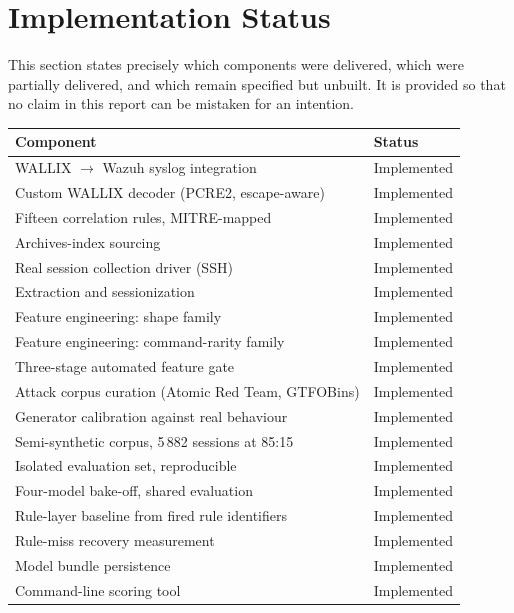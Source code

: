 \documentclass{classeENS}
\begin{document}
\section{Implementation Status}
\label{sec:status}

This section states precisely which components were delivered, which were partially delivered, and which remain specified but unbuilt. It is provided so that no claim in this report can be mistaken for an intention.

\begin{table}[H]
\centering
\begin{tabular}{|l|l|}
\hline
\textbf{Component} & \textbf{Status} \\
\hline
WALLIX $\rightarrow$ Wazuh syslog integration & Implemented \\
Custom WALLIX decoder (PCRE2, escape-aware) & Implemented \\
Fifteen correlation rules, MITRE-mapped & Implemented \\
Archives-index sourcing & Implemented \\
Real session collection driver (SSH) & Implemented \\
Extraction and sessionization & Implemented \\
Feature engineering: shape family & Implemented \\
Feature engineering: command-rarity family & Implemented \\
Three-stage automated feature gate & Implemented \\
Attack corpus curation (Atomic Red Team, GTFOBins) & Implemented \\
Generator calibration against real behaviour & Implemented \\
Semi-synthetic corpus, 5\,882 sessions at 85:15 & Implemented \\
Isolated evaluation set, reproducible & Implemented \\
Four-model bake-off, shared evaluation & Implemented \\
Rule-layer baseline from fired rule identifiers & Implemented \\
Rule-miss recovery measurement & Implemented \\
Model bundle persistence & Implemented \\
Command-line scoring tool & Implemented \\

\end{tabular}
\end{table}
\end{document}
